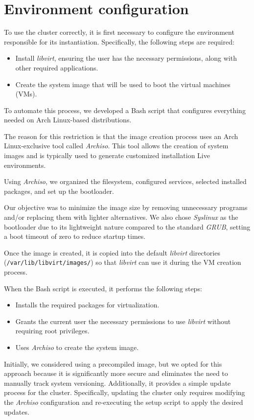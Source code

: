 \section{Environment configuration}
To use the cluster correctly, it is first necessary to configure the 
environment responsible for its instantiation. Specifically, the following
steps are required:
\begin{itemize}
	\item Install \textit{libvirt}, ensuring the user has the necessary permissions,
    along with other required applications.
	\item Create the system image that will be used to boot the virtual
    machines (VMs).
\end{itemize}
To automate this process, we developed a Bash script that configures 
everything needed on Arch Linux-based distributions.

The reason for this restriction is that the image creation process uses 
an Arch Linux-exclusive tool called \textit{Archiso}\cite{4}. 
This tool allows the creation of system images and is typically used 
to generate customized installation Live environments.

Using \textit{Archiso}, we organized the filesystem, configured services, selected 
installed packages, and set up the bootloader.

Our objective was to minimize the image size by removing unnecessary programs 
and/or replacing them with lighter alternatives. We also chose \textit{Syslinux} 
as the bootloader due to its lightweight nature compared to the standard 
\textit{GRUB}, setting a boot timeout of zero to reduce startup times.

Once the image is created, it is copied into the default 	\textit{libvirt} directories
(\texttt{/var/lib/libvirt/images/}) so that \textit{libvirt} can use it during 
the VM creation process.

When the Bash script is executed, it performs the following steps:
\begin{itemize}
	\item Installs the required packages for virtualization.
	\item Grants the current user the necessary permissions to use \textit{libvirt} 
    without requiring root privileges.
  \item Uses \textit{Archiso} to create the system image.
\end{itemize}
      Initially, we considered using a precompiled image, but we opted for this 
      approach because it is significantly more secure and eliminates the need to 
      manually track system versioning. Additionally, it provides a simple update 
      process for the cluster. Specifically, updating the cluster only requires modifying 
      the \textit{Archiso} configuration and re-executing the setup script to apply 
      the desired updates.
